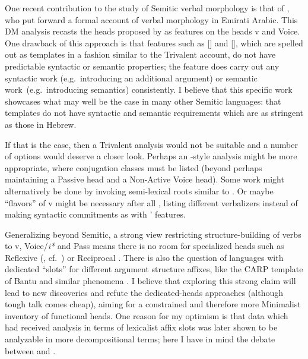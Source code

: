 \begin{exe}
\begin{xlist}
\begin{xlist}
\begin{xlist}
\begin{xlist}
\begin{xlist}
\begin{xlist}
\begin{exe}
\begin{xlist}
\begin{exe}
\begin{exe}
\begin{xlist}
\begin{exe}
\begin{exe}
\begin{xlist}
\begin{exe}
\begin{xlist}
\begin{exe}
\begin{xlist}
\begin{exe}
\begin{xlist}
\begin{exe}
\begin{xlist}
One recent contribution to the study of Semitic verbal morphology is that of \cite{alkaabintelitheos19}, who put forward a formal account of verbal morphology in Emirati Arabic. This DM analysis recasts the heads proposed by \cite{doron03} as features on the heads v and Voice. One drawback of this approach is that features such as [] and [], which are spelled out as templates in a fashion similar to the Trivalent account, do not have predictable syntactic or semantic properties; the  feature does carry out any syntactic work (e.g.~introducing an additional argument) or semantic work~(e.g.~introducing  semantics) consistently. I believe that this specific work showcases what may well be the case in many other Semitic languages: that templates do not have syntactic and semantic requirements which are as stringent as those in Hebrew.

If that is the case, then a Trivalent analysis would not be suitable and a number of options would deserve a closer look. Perhaps an \citeauthor{arad05}-style analysis might be more appropriate, where conjugation classes must be listed (beyond perhaps maintaining a Passive head and a Non-Active Voice head). Some work might alternatively be done by invoking semi-lexical roots similar to {\va}. Or maybe ``flavors'' of v might be necessary after all \citep{katie13}, listing different verbalizers instead of making syntactic commitments as with \citeauthor{alkaabintelitheos19}' features.

\label{r1:6:5}Generalizing beyond Semitic, a strong view restricting structure-building of verbs to v, Voice/\textit{i*} and Pass means there is no room for specialized heads such as Reflexive (\citealt{ahn15phd}, cf.~\citealt{spathas17camvoice,spathas17debrecen}) or Reciprocal \citep{bruening04}. There is also the question of languages with dedicated ``slots'' for different argument structure affixes, like the CARP template of Bantu and similar phenomena \citep{hyman03,paster05}. I believe that exploring this strong claim will lead to new discoveries and refute the dedicated-heads approaches (although tough talk comes cheap), aiming for a constrained and therefore more Minimalist inventory of functional heads. One reason for my optimism is that data which had received analysis in terms of lexicalist affix slots was later shown to be analyzable in more decompositional terms; here I have in mind the  debate between \cite{inkelas93} and \cite{noyer98}.


\end{xlist}
\end{exe}
\end{xlist}
\end{exe}
\end{xlist}
\end{exe}
\end{xlist}
\end{exe}
\end{xlist}
\end{exe}
\end{exe}
\end{xlist}
\end{exe}
\end{exe}
\end{xlist}
\end{exe}
\end{xlist}
\end{xlist}
\end{xlist}
\end{xlist}
\end{xlist}
\end{xlist}
\end{exe}
